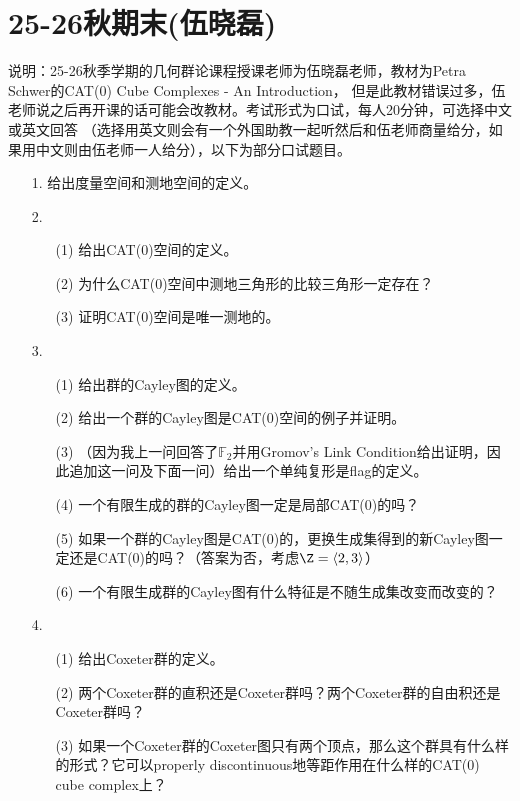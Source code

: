 
\section{25-26秋期末(伍晓磊)}
说明：25-26秋季学期的几何群论课程授课老师为伍晓磊老师，教材为Petra Schwer的CAT(0) Cube Complexes - An Introduction，
但是此教材错误过多，伍老师说之后再开课的话可能会改教材。考试形式为口试，每人20分钟，可选择中文或英文回答
（选择用英文则会有一个外国助教一起听然后和伍老师商量给分，如果用中文则由伍老师一人给分），以下为部分口试题目。
\begin{enumerate}
    \item[1.] 给出度量空间和测地空间的定义。
    \item[2.]
    \begin{enumerate}
        \item[(1)] 给出CAT(0)空间的定义。
        \item[(2)] 为什么CAT(0)空间中测地三角形的比较三角形一定存在？
        \item[(3)] 证明CAT(0)空间是唯一测地的。
    \end{enumerate}
    \item[3.]
    \begin{enumerate}
        \item[(1)] 给出群的Cayley图的定义。
        \item[(2)] 给出一个群的Cayley图是CAT(0)空间的例子并证明。
        \item[(3)] （因为我上一问回答了$\mathbb{F}_2$并用Gromov's Link Condition给出证明，因此追加这一问及下面一问）给出一个单纯复形是flag的定义。
        \item[(4)] 一个有限生成的群的Cayley图一定是局部CAT(0)的吗？
        \item[(5)] 如果一个群的Cayley图是CAT(0)的，更换生成集得到的新Cayley图一定还是CAT(0)的吗？（答案为否，考虑$\Z=\langle2,3\rangle$）
        \item[(6)] 一个有限生成群的Cayley图有什么特征是不随生成集改变而改变的？
    \end{enumerate}
    \item[4.]
    \begin{enumerate}
        \item[(1)] 给出Coxeter群的定义。
        \item[(2)] 两个Coxeter群的直积还是Coxeter群吗？两个Coxeter群的自由积还是Coxeter群吗？
        \item[(3)] 如果一个Coxeter群的Coxeter图只有两个顶点，那么这个群具有什么样的形式？它可以properly discontinuous地等距作用在什么样的CAT(0) cube complex上？
    \end{enumerate}
\end{enumerate}